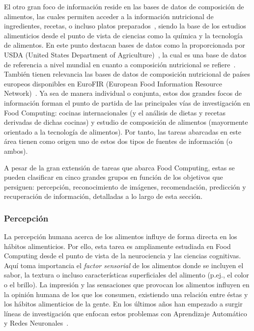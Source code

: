 El otro gran foco de información reside en las bases de datos de composición de alimentos, las cuales permiten acceder a la información nutricional de ingredientes, recetas, o incluso platos preparados~\cite{spanishStandariz}, siendo la base de los estudios alimenticios desde el punto de vista de ciencias como la química y la tecnología de alimentos. En este punto destacan bases de datos como la proporcionada por USDA (United States Department of Agriculture)~\cite{gebhardt2008usda}, la cual es una base de datos de referencia a nivel mundial en cuanto a composición nutricional se refiere~\cite{raper2004overview}. También tienen relevancia las bases de datos de composición nutricional de países europeos disponibles en EuroFIR (European Food Information Resource Network)~\cite{church2009eurofir}.
Ya sea de manera individual o conjunta, estos dos grandes focos de información forman el punto de partida de las principales vías de investigación en Food Computing: cocinas internacionales (y el análisis de dietas y recetas derivadas de dichas cocinas) y estudio de composición de alimentos (mayormente orientado a la tecnología de alimentos). Por tanto, las tareas abarcadas en este área tienen como origen uno de estos dos tipos de fuentes de información (o ambos).

\vspace{0.3cm}
A pesar de la gran extensión de tareas que abarca Food Computing, estas se pueden clasificar en cinco grandes grupos en función de los objetivos que persiguen: percepción, reconocimiento de imágenes, recomendación, predicción y recuperación de información, detalladas a lo largo de esta sección.

\subsubsection{Percepción}
La percepción humana acerca de los alimentos influye de forma directa en los hábitos alimenticios. Por ello, esta tarea es ampliamente estudiada en Food Computing desde el punto de vista de la neurociencia y las ciencias cognitivas. Aquí toma importancia el \textit{factor sensorial} de los alimentos donde se incluyen el sabor, la textura o incluso características superficiales del alimento (p.ej., el color o el brillo). La impresión y las sensaciones que provocan los alimentos influyen en la opinión humana de los que los consumen, existiendo una relación entre éstas y los hábitos alimenticios de la gente. En los últimos años han empezado a surgir líneas de investigación que enfocan estos problemas con Aprendizaje Automático y Redes Neuronales~\cite{ofli2017saki}.

